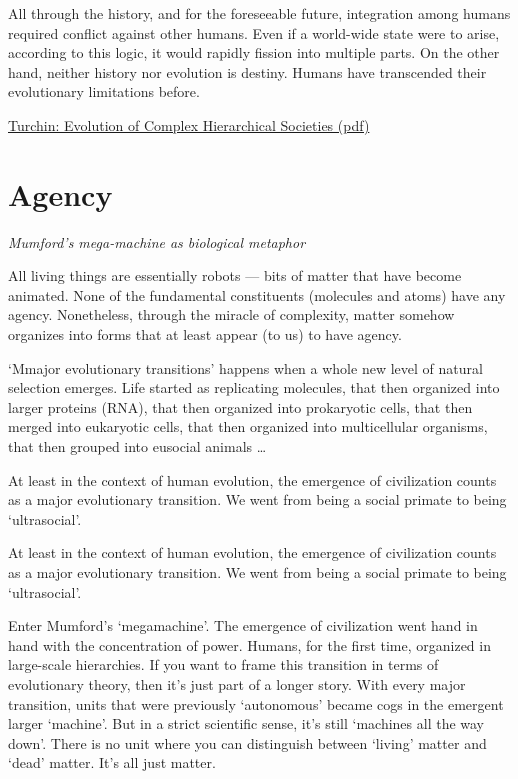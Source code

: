 \documentclass[
]{book}
\begin{document}
All through the history, and for the
foreseeable future, integration among humans required conflict
against other humans. Even if a world-wide state were to arise,
according to this logic, it would rapidly fission into multiple parts.
On the other hand, neither history nor evolution is destiny. Humans
have transcended their evolutionary limitations before.

\href{pdf/Turchin_Evolution_of_complex_hierarchical_societies.pdf}{Turchin: Evolution of Complex Hierarchical Societies (pdf)}

\hypertarget{agency}{%
\chapter{Agency}\label{agency}}

\emph{Mumford's mega-machine as biological metaphor}

All living things are essentially robots --- bits of matter that have become animated. None of the fundamental constituents (molecules and atoms) have any agency. Nonetheless, through the miracle of complexity, matter somehow organizes into forms that at least appear (to us) to have agency.

`Mmajor evolutionary transitions' happens when a whole new level of natural selection emerges. Life started as replicating molecules, that then organized into larger proteins (RNA), that then organized into prokaryotic cells, that then merged into eukaryotic cells, that then organized into multicellular organisms, that then grouped into eusocial animals \ldots{}

At least in the context of human evolution, the emergence of civilization counts as a major evolutionary transition. We went from being a social primate to being `ultrasocial'.

At least in the context of human evolution, the emergence of civilization counts as a major evolutionary transition. We went from being a social primate to being `ultrasocial'.

Enter Mumford's `megamachine'. The emergence of civilization went hand in hand with the concentration of power. Humans, for the first time, organized in large-scale hierarchies. If you want to frame this transition in terms of evolutionary theory, then it's just part of a longer story. With every major transition, units that were previously `autonomous' became cogs in the emergent larger `machine'. But in a strict scientific sense, it's still `machines all the way down'. There is no unit where you can distinguish between `living' matter and `dead' matter. It's all just matter.
\end{document}
